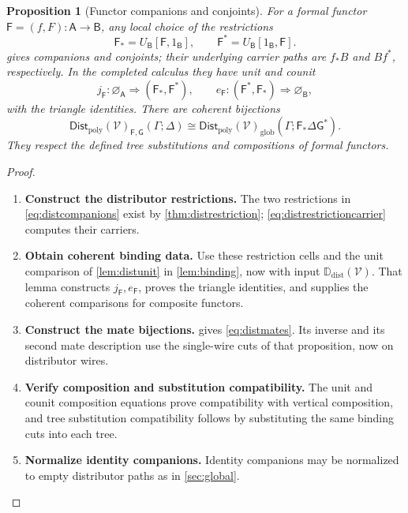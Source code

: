 \documentclass[11pt,reqno]{amsart}
\theoremstyle{plain}
\newtheorem{proposition}[theorem]{Proposition}
\theoremstyle{definition}
\theoremstyle{remark}
\numberwithin{equation}{section}
\newcommand{\V}{\mathcal V}
\newcommand{\Ddist}{\mathbb D_{\mathrm{dist}}}
\newcommand{\FDist}{\mathsf{Dist}_{\mathrm{poly}}}
\newcommand{\cell}{\mathrel{\Longrightarrow}}
\newcommand{\emp}[1]{\varnothing_{#1}}
\begin{document}
\begin{proposition}[Functor companions and conjoints]\label{prop:distmates}
For a formal functor $\mathsf F=(f,F):\mathsf A\to\mathsf B$,
any local choice of the restrictions
\begin{equation}\label{eq:distcompanions}
 \mathsf F_*=U_{\mathsf B}[\mathsf F,1_{\mathsf B}],
 \qquad
 \mathsf F^*=U_{\mathsf B}[1_{\mathsf B},\mathsf F].
\end{equation}
gives companions and conjoints; their underlying carrier paths are
$f_*B$ and $Bf^*$, respectively.
In the completed calculus they have unit and counit
\[
 j_{\mathsf F}:\emp{\mathsf A}\cell
       (\mathsf F_*,\mathsf F^*),\qquad
 e_{\mathsf F}:(\mathsf F^*,\mathsf F_*)\cell\emp{\mathsf B},
\]
with the triangle identities. There are coherent bijections
\begin{equation}\label{eq:distmates}
 \FDist(\V)_{\mathsf F,\mathsf G}(\Gamma;\Delta)
 \cong
 \FDist(\V)_{\mathrm{glob}}
      (\Gamma;\mathsf F_*\Delta\mathsf G^*).
\end{equation}
They respect the defined tree substitutions and compositions of formal
functors.
\end{proposition}
\begin{proof}\leavevmode
\begin{enumerate}
\item \textbf{Construct the distributor restrictions.} The two restrictions in \cref{eq:distcompanions} exist by
\cref{thm:distrestriction}; \cref{eq:distrestrictioncarrier} computes
their carriers.

\item \textbf{Obtain coherent binding data.} Use these restriction cells and the unit comparison of
\cref{lem:distunit} in \cref{lem:binding}, now with input
$\Ddist(\V)$. That lemma constructs $j_{\mathsf F},e_{\mathsf F}$,
proves the triangle identities, and supplies the coherent comparisons
for composite functors.

\item \textbf{Construct the mate bijections.}  gives
\cref{eq:distmates}. Its inverse and its second mate description use
the single-wire cuts of that proposition, now on distributor wires.

\item \textbf{Verify composition and substitution compatibility.} The unit and counit composition equations prove compatibility with
vertical composition, and tree substitution compatibility follows by
substituting the same binding cuts into each tree.

\item \textbf{Normalize identity companions.} Identity companions
may be normalized to empty distributor paths as in
\cref{sec:global}.\qedhere
\end{enumerate}
\end{proof}
\end{document}
